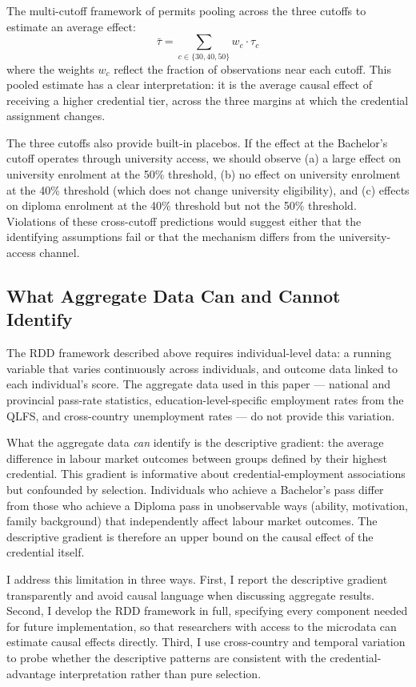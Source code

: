\documentclass[12pt]{article}
\begin{document}
The multi-cutoff framework of \citet{cattaneo2020multi} permits pooling across the three cutoffs to estimate an average effect:
\begin{equation}
\bar{\tau} = \sum_{c \in \{30,40,50\}} w_c \cdot \tau_c
\label{eq:pooled}
\end{equation}
where the weights $w_c$ reflect the fraction of observations near each cutoff. This pooled estimate has a clear interpretation: it is the average causal effect of receiving a higher credential tier, across the three margins at which the credential assignment changes.

The three cutoffs also provide built-in placebos. If the effect at the Bachelor's cutoff operates through university access, we should observe (a) a large effect on university enrolment at the 50\% threshold, (b) no effect on university enrolment at the 40\% threshold (which does not change university eligibility), and (c) effects on diploma enrolment at the 40\% threshold but not the 50\% threshold. Violations of these cross-cutoff predictions would suggest either that the identifying assumptions fail or that the mechanism differs from the university-access channel.

\subsection{What Aggregate Data Can and Cannot Identify}

The RDD framework described above requires individual-level data: a running variable that varies continuously across individuals, and outcome data linked to each individual's score. The aggregate data used in this paper --- national and provincial pass-rate statistics, education-level-specific employment rates from the QLFS, and cross-country unemployment rates --- do not provide this variation.

What the aggregate data \emph{can} identify is the descriptive gradient: the average difference in labour market outcomes between groups defined by their highest credential. This gradient is informative about credential-employment associations but confounded by selection. Individuals who achieve a Bachelor's pass differ from those who achieve a Diploma pass in unobservable ways (ability, motivation, family background) that independently affect labour market outcomes. The descriptive gradient is therefore an upper bound on the causal effect of the credential itself.

I address this limitation in three ways. First, I report the descriptive gradient transparently and avoid causal language when discussing aggregate results. Second, I develop the RDD framework in full, specifying every component needed for future implementation, so that researchers with access to the microdata can estimate causal effects directly. Third, I use cross-country and temporal variation to probe whether the descriptive patterns are consistent with the credential-advantage interpretation rather than pure selection.
\end{document}
